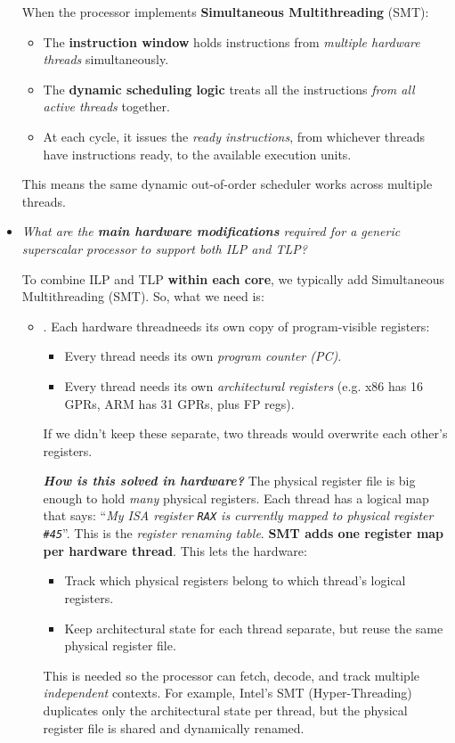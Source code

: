 \begin{itemize}
    When the processor implements \textbf{Simultaneous Multithreading} (SMT):
    \begin{itemize}
        \item The \textbf{instruction window} holds instructions from \emph{multiple hardware threads} simultaneously.
        \item The \textbf{dynamic scheduling logic} treats all the instructions \emph{from all active threads} together.
        \item At each cycle, it issues the \emph{ready instructions}, from whichever threads have instructions ready, to the available execution units.
    \end{itemize}
    This means the same dynamic out-of-order scheduler works across multiple threads.


    \item \emph{What are the \textbf{main hardware modifications} required for a generic superscalar processor to support both ILP and TLP?}

    \answer To combine ILP and TLP \textbf{within each core}, we typically add Simultaneous Multithreading (SMT). So, what we need is:
    \begin{itemize}
        \item {}. Each hardware thread\break needs its own copy of program-visible registers:
        \begin{itemize}
            \item Every thread needs its own \emph{program counter (PC)}.
            \item Every thread needs its own \emph{architectural registers} (e.g. x86 has 16 GPRs, ARM has 31 GPRs, plus FP regs).
        \end{itemize}
        If we didn't keep these separate, two threads would overwrite each other's registers.
        
        \textcolor{Green3}{ \textbf{\emph{How is this solved in hardware?}}} The physical register file is big enough to hold \emph{many} physical registers. Each thread has a logical map that says: ``\emph{My ISA register \texttt{RAX} is currently mapped to physical register \texttt{\#45}}''. This is the \emph{register renaming table}. \textbf{SMT adds one register map per hardware thread}. This lets the hardware:
        \begin{itemize}
            \item Track which physical registers belong to which thread's logical registers.
            \item Keep architectural state for each thread separate, but reuse the same physical register file.
        \end{itemize}
        This is needed so the processor can fetch, decode, and track multiple \emph{independent} contexts. For example, Intel's SMT (Hyper-Threading) duplicates only the architectural state per thread, but the physical register file is shared and dynamically renamed.


\end{itemize}
\end{itemize}
